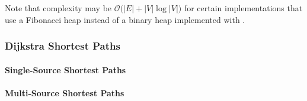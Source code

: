 Note that complexity may be $\mathcal{O}(|E| + |V|\log{|V|)}$ for certain implementations that use a Fibonacci heap
instead of a binary heap implemented with .

\subsubsection{Dijkstra Shortest Paths}


\paragraph{Single-Source Shortest Paths}
{\small
      
}

\paragraph{Multi-Source Shortest Paths}
{\small
      
}


